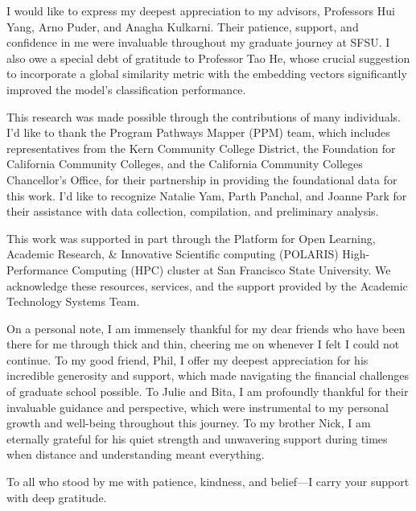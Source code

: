 \begin{acknowledgments}
I would like to express my deepest appreciation to my advisors, Professors Hui Yang, Arno Puder, and Anagha Kulkarni. Their patience, support, and confidence in me were invaluable throughout my graduate journey at SFSU. I also owe a special debt of gratitude to Professor Tao He, whose crucial suggestion to incorporate a global similarity metric with the embedding vectors significantly improved the model's classification performance.

This research was made possible through the contributions of many individuals. I'd like to thank the Program Pathways Mapper (PPM) team, which includes representatives from the Kern Community College District, the Foundation for California Community Colleges, and the California Community Colleges Chancellor's Office, for their partnership in providing the foundational data for this work.  I'd like to recognize Natalie Yam, Parth Panchal, and Joanne Park for their assistance with data collection, compilation, and preliminary analysis.

This work was supported in part through the Platform for Open Learning, Academic Research, \& Innovative Scientific computing (POLARIS) High-Performance Computing (HPC) cluster at San Francisco State University. We acknowledge these resources, services, and the support provided by the Academic Technology Systems Team.

On a personal note, I am immensely thankful for my dear friends who have been there for me through thick and thin, cheering me on whenever I felt I could not continue. To my good friend, Phil, I offer my deepest appreciation for his incredible generosity and support, which made navigating the financial challenges of graduate school possible. To Julie and Bita, I am profoundly thankful for their invaluable guidance and perspective, which were instrumental to my personal growth and well-being throughout this journey.  To my brother Nick, I am eternally grateful for his quiet strength and unwavering support during times when distance and understanding meant everything.

To all who stood by me with patience, kindness, and belief---I carry your support with deep gratitude.
\end{acknowledgments}